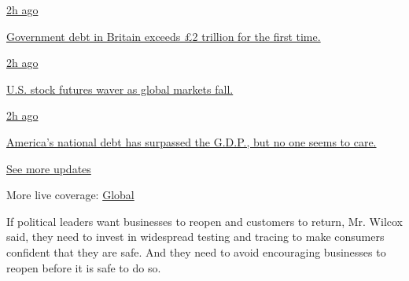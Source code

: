 \href{https://www.nytimes3xbfgragh.onion/live/2020/08/21/business/stock-market-today-coronavirus?action=click\&pgtype=Article\&state=default\&region=MAIN_CONTENT_1\&context=storylines_live_updates\#government-debt-in-britain-exceeds-2-trillion-for-the-first-time}{2h
ago}

\href{https://www.nytimes3xbfgragh.onion/live/2020/08/21/business/stock-market-today-coronavirus?action=click\&pgtype=Article\&state=default\&region=MAIN_CONTENT_1\&context=storylines_live_updates\#government-debt-in-britain-exceeds-2-trillion-for-the-first-time}{Government
debt in Britain exceeds £2 trillion for the first time.}

\href{https://www.nytimes3xbfgragh.onion/live/2020/08/21/business/stock-market-today-coronavirus?action=click\&pgtype=Article\&state=default\&region=MAIN_CONTENT_1\&context=storylines_live_updates\#us-stock-futures-waver-as-global-markets-fall}{2h
ago}

\href{https://www.nytimes3xbfgragh.onion/live/2020/08/21/business/stock-market-today-coronavirus?action=click\&pgtype=Article\&state=default\&region=MAIN_CONTENT_1\&context=storylines_live_updates\#us-stock-futures-waver-as-global-markets-fall}{U.S.
stock futures waver as global markets fall.}

\href{https://www.nytimes3xbfgragh.onion/live/2020/08/21/business/stock-market-today-coronavirus?action=click\&pgtype=Article\&state=default\&region=MAIN_CONTENT_1\&context=storylines_live_updates\#americas-national-debt-has-surpassed-the-gdp-but-no-one-seems-to-care}{2h
ago}

\href{https://www.nytimes3xbfgragh.onion/live/2020/08/21/business/stock-market-today-coronavirus?action=click\&pgtype=Article\&state=default\&region=MAIN_CONTENT_1\&context=storylines_live_updates\#americas-national-debt-has-surpassed-the-gdp-but-no-one-seems-to-care}{America's
national debt has surpassed the G.D.P., but no one seems to care.}

\href{https://www.nytimes3xbfgragh.onion/live/2020/08/21/business/stock-market-today-coronavirus?action=click\&pgtype=Article\&state=default\&region=MAIN_CONTENT_1\&context=storylines_live_updates}{See
more updates}

More live coverage:
\href{https://www.nytimes3xbfgragh.onion/2020/08/21/world/covid-19-coronavirus.html?action=click\&pgtype=Article\&state=default\&region=MAIN_CONTENT_1\&context=storylines_live_updates}{Global}

If political leaders want businesses to reopen and customers to return,
Mr. Wilcox said, they need to invest in widespread testing and tracing
to make consumers confident that they are safe. And they need to avoid
encouraging businesses to reopen before it is safe to do so.

